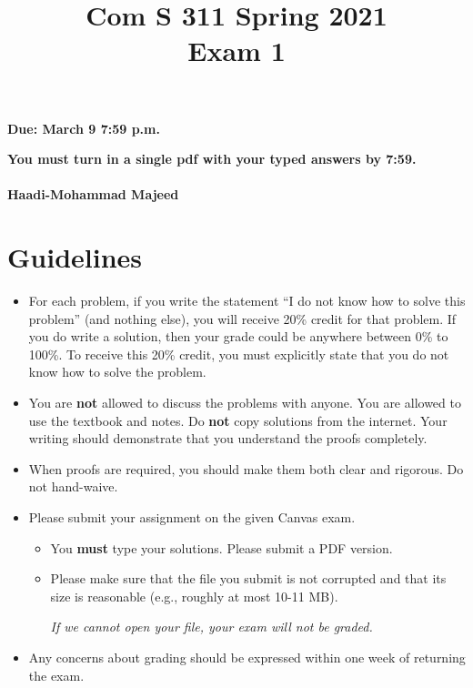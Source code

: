 \documentclass[11pt]{amsart}
\begin{document}


\title{
Com S 311 Spring 2021\\
Exam 1
}

\maketitle


\vspace{-.8cm}
\begin{center}
{\bf Due:  March 9 7:59 p.m.}

\smallskip
\textbf{You must turn in a single pdf with your typed answers by 7:59.\\}
\textbf{\\Haadi-Mohammad Majeed}
\end{center}

\medskip

\section*{Guidelines}


\begin{itemize}

\item %
For each problem, if you write  the statement ``I do not know how to solve this problem'' (and nothing else), you will receive 20\% credit for that problem. If you do write a solution, then your grade could be anywhere between 0\% to 100\%.
To receive this 20\% credit, you must explicitly state that you do not know how to solve the problem.

\item You are \textbf{not} allowed to discuss the problems with anyone. You are allowed to use the textbook and notes. Do \textbf{not} copy solutions from the internet. Your writing should demonstrate that you understand the proofs completely.

\item When proofs are required, you should make them both clear and rigorous. Do not hand-waive.

 \item Please submit your assignment on the given Canvas exam.
 \begin{itemize}
\item  You \textbf{must} type your solutions. Please submit a PDF version.
\item Please make sure that the file you submit is not corrupted and that its size is reasonable (e.g., roughly at most 10-11 MB).
\begin{center}
\emph{If we cannot open your file, your exam will not be graded.}
\end{center}
\end{itemize}

\item Any concerns about grading should be expressed within one week of
returning the exam. 
 
\end{itemize}
\end{document}
